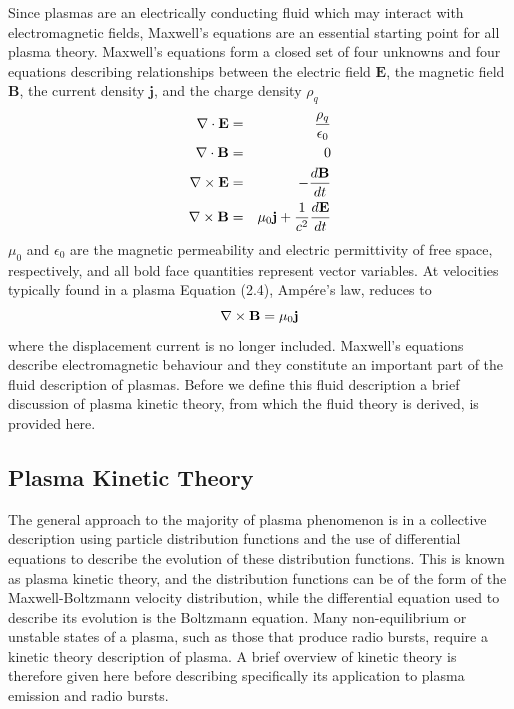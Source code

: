 Since plasmas are an electrically conducting fluid which may interact with electromagnetic fields, Maxwell's equations are an essential starting point for all plasma theory. Maxwell's equations form a closed set of four unknowns and four equations describing relationships between the electric field $\mathbf{E}$, the magnetic field $\mathbf{B}$, the current density $\mathbf{j}$, and the charge density $\rho_q$
\begin{eqnarray}
\nabla \cdot \mathbf{E} &=& \frac{\rho_q}{\epsilon_0} \\
\nabla \cdot \mathbf{B} &=& 0 \\
{\bf \nabla} \times{\mathbf{E}} &=& - \frac{d\mathbf{B}}{dt} \\
{\bf \nabla} \times{\mathbf{B}} &=& \mu_0 \mathbf{j} + \frac{1}{c^2}\frac{d\mathbf{E}}{dt} 
\end{eqnarray}
$\mu_0$ and $\epsilon_0$ are the magnetic permeability and electric permittivity of free space, respectively, and all bold face quantities represent vector variables. At velocities typically found in a plasma Equation (2.4), Amp\'{e}re's law, reduces to
\begin{equation}
{\bf \nabla} \times{\mathbf{B}} = \mu_0 \mathbf{j}
\label{eqn:amperes_law}
\end{equation}
where the displacement current is no longer included. Maxwell's equations describe electromagnetic behaviour and they constitute an important part of the fluid description of plasmas. Before we define this fluid description a brief discussion of plasma kinetic theory, from which the fluid theory is derived, is provided here.

\subsection{Plasma Kinetic Theory}\label{sec:11}

The general approach to the majority of plasma phenomenon is in a collective description using particle distribution functions and the use of differential equations to describe the evolution of these distribution functions. This is known as plasma kinetic theory, and the distribution functions can be of the form of the Maxwell-Boltzmann velocity distribution, while the differential equation used to describe its evolution is the Boltzmann equation. Many non-equilibrium or unstable states of a plasma, such as those that produce radio bursts, require a kinetic theory description of plasma. A brief overview of kinetic theory is therefore given here before describing specifically its application to plasma emission and radio bursts.

